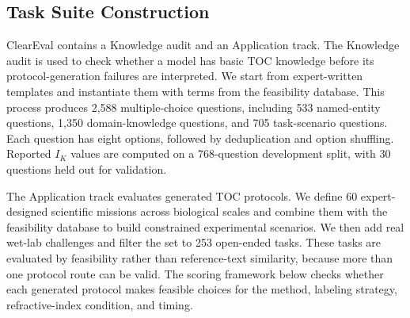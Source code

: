 \documentclass[conference]{IEEEtran}
\begin{document}
\begin{table}[htbp]
\centering
\caption{Feasibility database inventory. Each knowledge base stores TOC
evidence or expert-reviewed rules used for task construction or protocol
scoring.}
\label{tab:db_inventory}
\end{table}

\subsection{Task Suite Construction}

ClearEval contains a Knowledge audit and an Application track. The Knowledge
audit is used to check whether a model has basic TOC knowledge before its
protocol-generation failures are interpreted. We start from expert-written
templates and instantiate them with terms from the feasibility database. This
process produces 2{,}588 multiple-choice questions, including 533 named-entity
questions, 1{,}350 domain-knowledge questions, and 705 task-scenario questions.
Each question has eight options, followed by deduplication and option
shuffling. Reported $I_K$ values are computed on a 768-question development
split, with 30 questions held out for validation.

The Application track evaluates generated TOC protocols. We define 60
expert-designed scientific missions across biological scales and combine them
with the feasibility database to build constrained experimental scenarios. We
then add real wet-lab challenges and filter the set to 253 open-ended tasks.
These tasks are evaluated by feasibility rather than reference-text similarity,
because more than one protocol route can be valid. The scoring framework below
checks whether each generated protocol makes feasible choices for the method,
labeling strategy, refractive-index condition, and timing.
\end{document}
